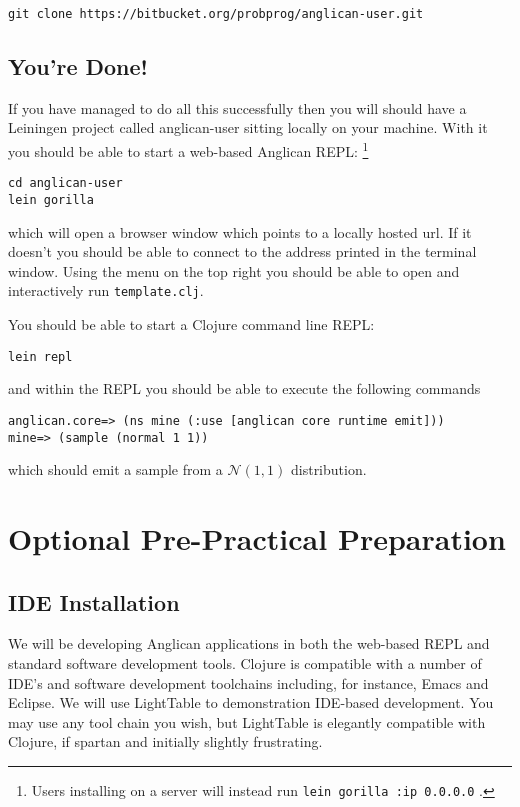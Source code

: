 \documentclass{article}
\begin{document}
\begin{verbatim}
git clone https://bitbucket.org/probprog/anglican-user.git
\end{verbatim}

\subsection{You're Done!}

If you have managed to do all this successfully then you will should have a 
Leiningen project called anglican-user sitting locally on your machine.  With it 
you should be able to start a web-based Anglican REPL:
\footnote{Users installing on a server will instead run \texttt{lein gorilla :ip 0.0.0.0} .}

\begin{verbatim}
cd anglican-user
lein gorilla
\end{verbatim}
which will open a browser window which points to a locally hosted url.  If it doesn't 
you should be able to connect to the address printed in the terminal window.  Using the menu on the top right you should be able to open and interactively run \texttt{template.clj}. 

You should be able to start a Clojure command line REPL:

\begin{verbatim}
lein repl
\end{verbatim}

\noindent and within the REPL you should be able to execute the following commands

\begin{verbatim}
anglican.core=> (ns mine (:use [anglican core runtime emit]))
mine=> (sample (normal 1 1))
\end{verbatim}
\noindent which should emit a sample from a $\mathcal{N}(1,1)$ distribution.

\section{Optional Pre-Practical Preparation}

\subsection{IDE Installation}

We will be developing Anglican applications in both the web-based REPL
and standard software development tools.  Clojure
is compatible with a number of IDE's and software development toolchains 
including, for instance, Emacs and Eclipse.  We will use LightTable
to demonstration IDE-based development.  You may use any tool chain you
wish, but LightTable is elegantly compatible with Clojure, if spartan
and initially slightly frustrating.
\end{document}
